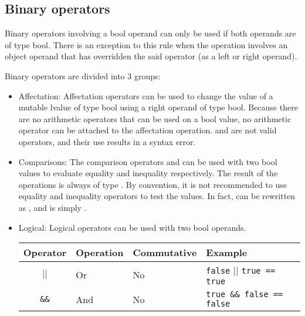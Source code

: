 \subsection{Binary operators}
\label{sec:org030ae50}

Binary operators involving a bool operand can only be used if both operands are
of type bool. There is an exception to this rule when the operation involves an
object operand that has overridden the said operator (as a left or right
operand).

Binary operators are divided into 3 groups:

\begin{itemize}
  \setlength\itemsep{-4pt}
\item Affectation: Affectation operators can be used to change the value of a
  mutable lvalue of type bool using a right operand of type bool. Because there
  are no arithmetic operators that can be used on a bool value, no arithmetic
  operator can be attached to the affectation operation. \token{\&\&=} and
  \token{||=} are not valid operators, and their use results in a syntax error.

\item Comparisons: The comparison operators \token{==} and \token{!=} can be
  used with two bool values to evaluate equality and inequality respectively.
  The result of the operations is always of type . By convention,
  it is not recommended to use equality and inequality operators to test the
   values. In fact,  can be rewritten as
  , and  is simply .

\item Logical: Logical operators can be used with two bool operands.

  \begin{center}
    \begin{adjustbox}{max width=1.0\linewidth}
      \begin{tabular}{|c|l l l|}
        \hline
        Operator & Operation & Commutative & Example\\[0pt]
        \hline
        \hline
        \texttt{\(\vert\vert\)} & Or & No & \texttt{false} \(\vert{} \vert{}\) \texttt{true == true}\\[0pt]
        \texttt{\&\&} & And & No & \texttt{true \&\& false == false}\\[0pt]
        \hline
      \end{tabular}
    \end{adjustbox}
  \end{center}


\end{itemize}
